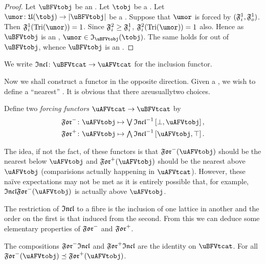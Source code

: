 \documentclass[%
a4paper,%
arxiv,%
defaults
]{myclass}
\begin{document}
\begin{proof}
Let \(\uBFVtobj\) be an \uBFVtobjalt.
Let \(\tobj\) be a \tobj.
Let \(\umor \colon \ufunc(\tobj) \to \forfunc[\uBFVtobj]\) be a \umor.
Suppose that \(\umor\) is forced by \((\iforce^1, \oforce^1)\).
Then \(\iforce^1(\trials{\umor}) = 1\).
Since \(\iforce^2 \ge \iforce^1\), \(\iforce^2(\trials{\umor}) = 1\) also.
Hence as \(\uBFVtobj\) is an \uBFVtobjalt, \(\umor \in \itest_{\uBFVtobj}(\tobj)\).
The same holds for \umors out of \(\uBFVtobj\), whence \(\uBFVtobj\) is an \uAFVtobjalt.
\end{proof}

\begin{defn}
We write \(\incfunc \colon \uBFVtcat \to \uAFVtcat\) for the inclusion functor.
\end{defn}

Now we shall construct a functor in the opposite direction.
Given a \uAFVtobjalt, we wish to define a ``nearest'' \uBFVtobjalt.
It is obvious that there are\emhyp{}usually\emhyp{}two choices.

\begin{defn}
Define two \emph{forcing functors} \(\uAFVtcat \to \uBFVtcat\) by
%
\begin{align*}
\Jforfunc \colon \uAFVtobj &\mapsto \join \incfunc^{-1} \left[\bot, \uAFVtobj\right], \\
%
\Mforfunc \colon \uAFVtobj & \mapsto \meet \incfunc^{-1} \left[\uAFVtobj, \top\right].
\end{align*}
\end{defn}

The idea, if not the fact, of these functors is that \(\Jforfunc(\uAFVtobj)\) should be the nearest \uBFVtobjalt below \(\uAFVtobj\) and \(\Mforfunc(\uAFVtobj)\) should be the nearest \uBFVtobjalt above \(\uAFVtobj\) (comparisions actually happening in \(\uAFVtcat\)).
However, these na\"ive expectations may not be met as it is entirely possible that, for example, \(\incfunc\Jforfunc(\uAFVtobj)\) is actually above \(\uAFVtobj\).

The restriction of \(\incfunc\) to a fibre is the inclusion of one lattice in another and the order on the first is that induced from the second.
From this we can deduce some elementary properties of \(\Jforfunc\) and \(\Mforfunc\).

\begin{lemma}
The compositions \(\Jforfunc\incfunc\) and \(\Mforfunc\incfunc\) are the identity on \(\uBFVtcat\).
For all \uAFVtobjalts[\uAFVtobj] \(\Jforfunc(\uAFVtobj) \preceq \Mforfunc(\uAFVtobj)\).
\end{lemma}
\end{document}
